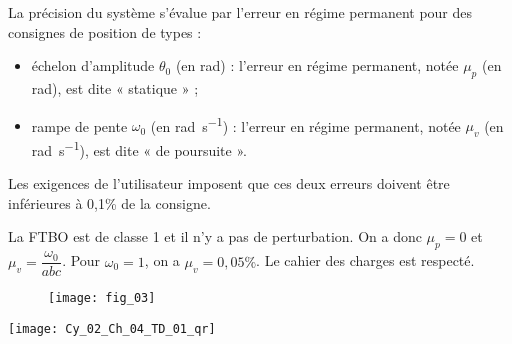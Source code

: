 \ifprof
\else


 La précision du système s’évalue par l’erreur en régime permanent pour des consignes de position de types :
 \begin{itemize}
 \item échelon d’amplitude $\theta_0$ (en \si{rad}) : l’erreur en régime permanent, notée $\mu_p$ (en rad), est dite « statique » ;
\item rampe de pente $\omega_0$ (en \si{rad.s^{-1}}) : l’erreur en régime permanent, notée $\mu_v$ (en \si{rad.s^{-1}}), est dite « de poursuite ».
\end{itemize}
Les exigences de l’utilisateur imposent que ces deux erreurs doivent être inférieures à 0,1\% de la consigne.
\fi

\ifprof
\begin{corrige}
La FTBO est de classe 1 et il n'y a pas de perturbation. On a donc $\mu_p = 0 $ et $\mu_v = \dfrac{\omega_0}{abc}$. Pour $\omega_0 =1$, on a $\mu_v =0,05\%$.
Le cahier des charges est respecté.
\end{corrige}
\else
\fi



\ifprof
\else
{}
\fi


\begin{figure} [!h]
\centering
\texttt{[image: fig\_03]}
\end{figure}


\ifprof
\else
\begin{marginfigure}
\centering
\texttt{[image: Cy\_02\_Ch\_04\_TD\_01\_qr]}
\end{marginfigure}
\fi
